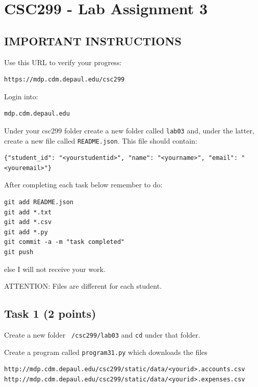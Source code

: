 \documentclass[12pt]{article}
\begin{document}
\section{CSC299 - Lab Assignment 3}

\subsection*{IMPORTANT INSTRUCTIONS}

\noindent Use this URL to verify your progress:
\begin{verbatim}
https://mdp.cdm.depaul.edu/csc299
\end{verbatim}

\noindent Login into:
\begin{verbatim}
mdp.cdm.depaul.edu
\end{verbatim}

\noindent Under your csc299 folder create a new folder called {\tt lab03} and, under the latter, create a new file called {\tt README.json}. This file should contain:

\begin{verbatim}
{"student_id": "<yourstudentid>", "name": "<yourname>", "email": "<youremail>"}
\end{verbatim}

\noindent After completing each task below remember to do:

\begin{verbatim}
git add README.json
git add *.txt
git add *.csv 
git add *.py
git commit -a -m "task completed"
git push
\end{verbatim}

\noindent  else I will not receive your work.

\noindent ATTENTION: Files are different for each student.

\subsection{Task 1 (2 points)}

\noindent  Create a new folder {\tt ~/csc299/lab03} and {\tt cd} under that folder.

\noindent  Create a program called {\tt program31.py} which downloads the files
\begin{verbatim}
http://mdp.cdm.depaul.edu/csc299/static/data/<yourid>.accounts.csv
http://mdp.cdm.depaul.edu/csc299/static/data/<yourid>.expenses.csv
\end{verbatim}
\end{document}
